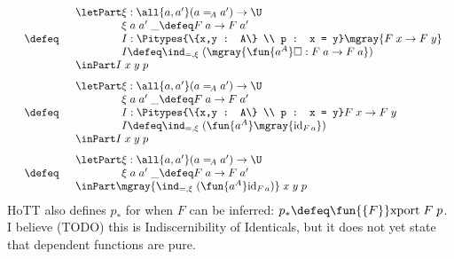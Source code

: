 \documentclass[11pt]{article} %
\theoremstyle{definition}
\theoremstyle{remark}
\begin{document}
\[\begin{array}{rcl}
\begin{array}{l}
      \end{array} \\ \\[-0.5em]
  &\defeq&
      \begin{array}{l}
        \letPart \xi : \all{a,a'} (a =_{\!A} a') \to \U \\
        \phantom{\letPart\mathstrut} \xi\;a\;a'\;\_ \defeq F\;a \to F\;a' \\
        \phantom{\letPart\mathstrut} I : \Pitypes{\{x,y : A\} \\ p : x = y} \mgray{F\;x \to F\;y} \\
        \phantom{\letPart\mathstrut} I \defeq \ind_{=,\xi}\;(\mgray{\fun{a^A} \square : F\;a \to F\;a}) \\
        \inPart I \;x\;y\;p\\
      \end{array} \\ \\[-0.5em]
  &\defeq&
      \begin{array}{l}
        \letPart \xi : \all{a,a'} (a =_{\!A} a') \to \U \\
        \phantom{\letPart\mathstrut} \xi\;a\;a'\;\_ \defeq F\;a \to F\;a' \\
        \phantom{\letPart\mathstrut} I : \Pitypes{\{x,y : A\} \\ p : x = y} F\;x \to F\;y \\
        \phantom{\letPart\mathstrut} I \defeq \ind_{=,\xi}\;(\fun{a^A} \mgray{\mathrm{id}_{F\,a}}) \\
        \inPart I \;x\;y\;p\\
      \end{array} \\ \\[-0.5em]
  &\defeq&
      \begin{array}{l}
        \letPart \xi : \all{a,a'} (a =_{\!A} a') \to \U \\
        \phantom{\letPart\mathstrut} \xi\;a\;a'\;\_ \defeq F\;a \to F\;a' \\
        \inPart \mgray{\ind_{=,\xi}\;(\fun{a^A} \mathrm{id}_{F\,a})}\;x\;y\;p \\
      \end{array} \\
\end{array}\]
HoTT also defines $p_*$ for when $F$ can be inferred: $p_* \defeq \fun{\{F\}}\mathrm{xport}\;F\;p$.
I believe (TODO) this is Indiscernibility of Identicals, but it does not yet state that dependent functions are pure.
\end{document}
